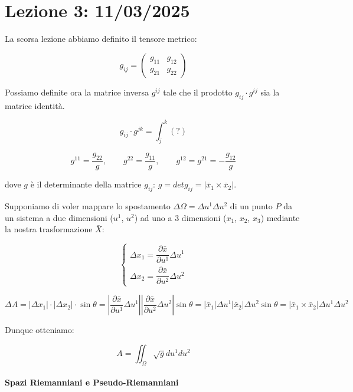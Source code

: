 \newpage

\chapter{Lezione 3: 11/03/2025}

La scorsa lezione abbiamo definito il tensore metrico:

$$
g_{ij} = \begin{pmatrix}
    g_{11} & g_{12} \\
    g_{21} & g_{22}
\end{pmatrix}
$$

Possiamo definite ora la matrice inversa $g^{ij}$ tale che il prodotto $g_{ij} \cdot g^{ij}$ sia la matrice identità.

$$
g_{ij} \cdot g^{jk} = \int_j^k (?)
$$



$$
g^{11} = \frac{g_{22}}{g}, \quad \quad g^{22} = \frac{g_{11}}{g}, \quad \quad g^{12} = g^{21} = -\frac{g_{12}}{g}
$$

dove $g$ è il determinante della matrice $g_{ij}$: $g = det g_{ij} = |\bar x_1 \times \bar x_2|$.

\vspace{1em}

Supponiamo di voler mappare lo spostamento $\Delta \Omega = \Delta u^{1} \Delta u^{2}$ di un punto $P$ da un sistema a due dimensioni ($u^1$, $u^2$) ad uno a 3 dimensioni ($x_1$, $x_2$, $x_3$) mediante la nostra trasformazione $\bar X$:



$$
\begin{cases}
\Delta x_1 = \dfrac {\partial \bar x}{\partial u^1} \Delta u^1\\
\Delta x_2 = \dfrac {\partial \bar x}{\partial u^2} \Delta u^2
\end{cases}
$$

$$
\Delta A = |\Delta x_1| \cdot |\Delta x_2| \cdot \sin \theta = 
\left | \dfrac {\partial \bar x}{\partial u^1} \Delta u^1 \right |
\left | \dfrac {\partial \bar x}{\partial u^2} \Delta u^2 \right |
\sin \theta = |\bar x_1| \Delta u^1 |\bar x_2| \Delta u^2 \sin \theta =
|\bar x_1 \times \bar x_2| \Delta u^1 \Delta u^2
$$

Dunque otteniamo:

$$
A = \iint_{\Omega} \sqrt{g} du^1 du^2$$

\subsubsection{Spazi Riemanniani e Pseudo-Riemanniani}

